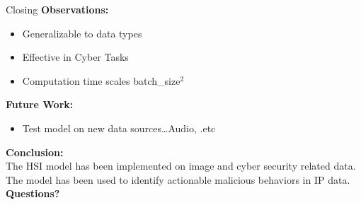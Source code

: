 \begin{frame}{Closing}
    \textbf{Observations:}
    \begin{itemize}
        \item Generalizable to data types
        \item Effective in Cyber Tasks
        \item Computation time scales batch\_size$^2$
    \end{itemize}
    \vfill
    \textbf{Future Work:}
    \begin{itemize}
        \item Test model on new data sources\dots Audio, .etc
    \end{itemize}
    \vfill
    \textbf{Conclusion:}\\
    The HSI model has been implemented on image and cyber security related data. The model has been used to identify actionable malicious behaviors in IP data.
    \vfill
    \bc
    \textbf{Questions?}
    \ec
    \vfill


\end{frame}